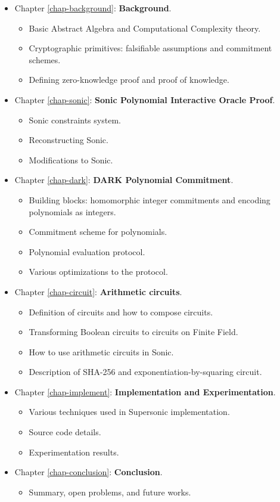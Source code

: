 \begin{itemize}
    \item Chapter \ref{chap-background}: \textbf{Background}.
    \begin{itemize}
        \item Basic Abstract Algebra and Computational Complexity theory.
        \item Cryptographic primitives: falsifiable assumptions and commitment schemes.
        \item Defining zero-knowledge proof and proof of knowledge.
    \end{itemize}
    \item Chapter \ref{chap-sonic}: \textbf{Sonic Polynomial Interactive Oracle Proof}.
    \begin{itemize}
        \item Sonic constraints system.
        \item Reconstructing Sonic.
        \item Modifications to Sonic.
    \end{itemize}
    \item Chapter \ref{chap-dark}: \textbf{DARK Polynomial Commitment}.
    \begin{itemize}
        \item Building blocks: homomorphic integer commitments and encoding polynomials as integers.
        \item Commitment scheme for polynomials.
        \item Polynomial evaluation protocol.
        \item Various optimizations to the protocol.
    \end{itemize}
    \item Chapter \ref{chap-circuit}: \textbf{Arithmetic circuits}.
    \begin{itemize}
        \item Definition of circuits and how to compose circuits.
        \item Transforming Boolean circuits to circuits on Finite Field.
        \item How to use arithmetic circuits in Sonic.
        \item Description of SHA-256 and exponentiation-by-squaring circuit.
    \end{itemize}
    \item Chapter \ref{chap-implement}: \textbf{Implementation and Experimentation}.
    \begin{itemize}
        \item Various techniques used in Supersonic implementation.
        \item Source code details.
        \item Experimentation results.
    \end{itemize}
    \item Chapter \ref{chap-conclusion}: \textbf{Conclusion}.
    \begin{itemize}
        \item Summary, open problems, and future works.
    \end{itemize}
\end{itemize}
